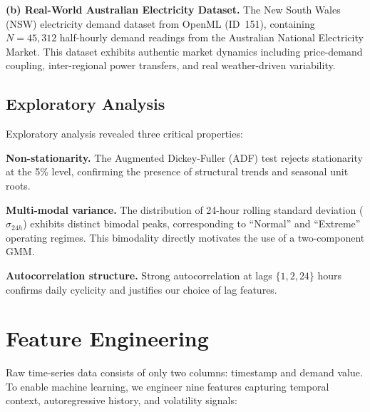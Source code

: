 \documentclass[conference, 10pt]{IEEEtran}
\begin{document}
\textbf{(b) Real-World Australian Electricity Dataset.} The New South Wales (NSW) electricity demand dataset from OpenML (ID~151), containing $N = 45{,}312$ half-hourly demand readings from the Australian National Electricity Market. This dataset exhibits authentic market dynamics including price-demand coupling, inter-regional power transfers, and real weather-driven variability.

\subsection{Exploratory Analysis}

Exploratory analysis revealed three critical properties:

\textbf{Non-stationarity.} The Augmented Dickey-Fuller (ADF) test rejects stationarity at the 5\% level, confirming the presence of structural trends and seasonal unit roots.

\textbf{Multi-modal variance.} The distribution of 24-hour rolling standard deviation ($\sigma_{24h}$) exhibits distinct bimodal peaks, corresponding to ``Normal'' and ``Extreme'' operating regimes. This bimodality directly motivates the use of a two-component GMM.

\textbf{Autocorrelation structure.} Strong autocorrelation at lags $\{1, 2, 24\}$ hours confirms daily cyclicity and justifies our choice of lag features.

\section{Feature Engineering}

Raw time-series data consists of only two columns: timestamp and demand value. To enable machine learning, we engineer nine features capturing temporal context, autoregressive history, and volatility signals:
\end{document}
